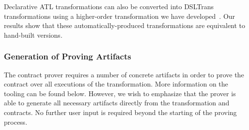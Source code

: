 Declarative ATL transformations can also be converted into DSLTrans transformations using a higher-order transformation we have developed~\cite{Oakes2016}. Our results show that these automatically-produced transformations are equivalent to hand-built versions.

%
%


\subsubsection{Generation of Proving Artifacts}

The contract prover requires a number of concrete artifacts in order to prove the contract over all executions of the transformation. More information on the tooling can be found below. However, we wish to emphasize that the prover is able to generate all necessary artifacts directly from the transformation and contracts. No further user input is required beyond the starting of the proving process.

